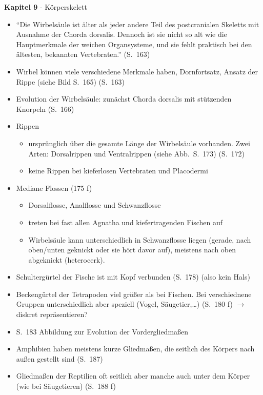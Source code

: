 \textbf{Kapitel 9} - Körperskelett
\begin{itemize}
 \item "`Die Wirbelsäule ist älter als jeder andere Teil des postcranialen Skeletts mit Ausnahme der Chorda dorsalis. Dennoch ist sie nicht so alt wie die Hauptmerkmale der weichen Organsysteme, und sie fehlt praktisch bei den ältesten, bekannten Vertebraten."' (S.\ 163)
 \item Wirbel können viele verschiedene Merkmale haben, \zb Dornfortsatz, Ansatz der Rippe (siehe Bild S.\ 165) (S.\ 163)
 \item Evolution der Wirbelsäule: zunächst Chorda dorsalis mit stützenden Knorpeln (S.\ 166)
 \item Rippen
 \begin{itemize}
  \item ursprünglich über die gesamte Länge der Wirbelsäule vorhanden. Zwei Arten: Dorsalrippen und Ventralrippen (siehe Abb.\ S.\ 173) (S.\ 172)
  \item keine Rippen bei kieferlosen Vertebraten und Placodermi
 \end{itemize}
 \item Mediane Flossen (175 f)
 \begin{itemize}
  \item Dorsalflosse, Analflosse und Schwanzflosse
  \item treten bei fast allen Agnatha und kiefertragenden Fischen auf
  \item Wirbelsäule kann unterschiedlich in Schwanzflosse liegen (gerade, nach oben/unten geknickt oder sie hört davor auf), meistens nach oben abgeknickt (heterocerk).
 \end{itemize}
 \item Schultergürtel der Fische ist mit Kopf verbunden (S.\ 178) (also kein Hals)
 \item Beckengürtel der Tetrapoden viel größer als bei Fischen. Bei verschiednene Gruppen unterschiedlich aber speziell (\zb Vogel, Säugetier,\dots) (S.\ 180 f) $\rightarrow$ diskret repräsentieren?
 \item S.\ 183 Abbildung zur Evolution der Vordergliedmaßen
 \item Amphibien haben meistens kurze Gliedmaßen, die seitlich des Körpers nach außen gestellt sind (S.\ 187)
 \item Gliedmaßen der Reptilien oft seitlich aber manche auch unter dem Körper (wie bei Säugetieren) (S.\ 188 f)
\end{itemize}

